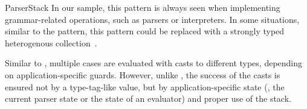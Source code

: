 \begin{pattern}{ParserStack}
\issues{}
In our sample,
this pattern is always seen when implementing grammar-related operations,
such as parsers or interpreters.
In some situations, similar to the  pattern,
this pattern could be replaced with a strongly typed heterogenous collection~\citep{kiselyovStronglyTypedHeterogeneous2004}.

Similar to ,
multiple cases are evaluated with casts to different types,
depending on application-specific guards.
However, unlike , 
the success of the casts is ensured not by a type-tag-like value,
but by application-specific state
(\eg{}, the current parser state or the state of an evaluator)
and proper use of the stack.

\end{pattern}
